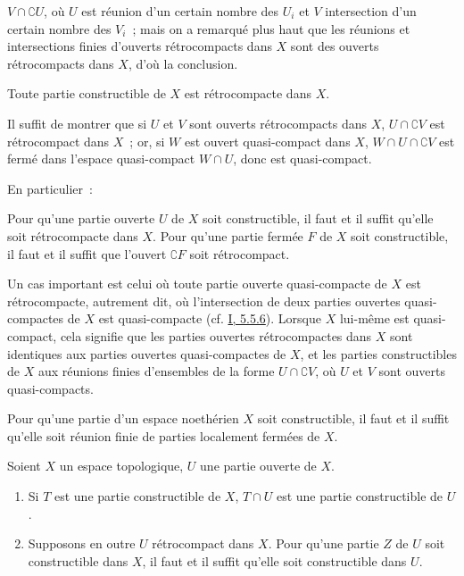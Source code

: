 $V\cap\complement{U}$, où $U$ est réunion d'un certain nombre des $U_i$ et
$V$ intersection d'un certain nombre des $V_i$~; mais on a remarqué plus
haut que les réunions et intersections finies d'ouverts rétrocompacts dans
$X$ sont des ouverts rétrocompacts dans $X$, d'où la conclusion.

\begin{corollary}[9.1.4]
\label{0.9.1.4-fr}
Toute partie constructible de $X$ est rétrocompacte dans $X$.
\end{corollary}

Il suffit de montrer que si $U$ et $V$ sont ouverts rétrocompacts dans $X$,
$U\cap\complement{V}$ est rétrocompact dans $X$~; or, si $W$ est ouvert
quasi-compact dans $X$, $W\cap U\cap\complement{V}$ est fermé dans l'espace
quasi-compact $W\cap U$, donc est quasi-compact.

En particulier~:

\begin{corollary}[9.1.5]
\label{0.9.1.5-fr}
Pour qu'une partie ouverte $U$ de $X$ soit constructible, il faut et il
suffit qu'elle soit rétrocompacte dans $X$. Pour qu'une partie fermée $F$ de
$X$ soit constructible, il faut et il suffit que l'ouvert $\complement{F}$
soit rétrocompact.
\end{corollary}

\begin{env}[9.1.6]
\label{0.9.1.6-fr}
Un cas important est celui où toute partie ouverte quasi-compacte de $X$ est
rétrocompacte, autrement dit, où l'intersection de deux parties ouvertes
quasi-compactes de $X$ est quasi-compacte
(cf. \hyperref[I.5.5.6-fr]{I, 5.5.6}). Lorsque $X$ lui-même est
quasi-compact, cela signifie que les parties ouvertes rétrocompactes dans
$X$ sont identiques aux parties ouvertes quasi-compactes de $X$, et les
parties constructibles de $X$ aux réunions finies d'ensembles de la forme
$U\cap\complement{V}$, où $U$ et $V$ sont ouverts quasi-compacts.
\end{env}

\begin{corollary}[9.1.7]
\label{0.9.1.7-fr}
Pour qu'une partie d'un espace noethérien $X$ soit constructible, il faut et
il suffit qu'elle soit réunion finie de parties localement fermées de $X$.
\end{corollary}

\begin{proposition}[9.1.8]
\label{0.9.1.8-fr}
Soient $X$ un espace topologique, $U$ une partie ouverte de $X$.
\begin{enumerate}
  \item[(i)] Si $T$ est une partie constructible de $X$, $T\cap U$ est une
    partie constructible de $U$.
  \item[(ii)] Supposons en outre $U$ rétrocompact dans $X$. Pour qu'une
    partie $Z$ de $U$ soit constructible dans $X$, il faut et il suffit
    qu'elle soit constructible dans $U$.
\end{enumerate}
\end{proposition}

